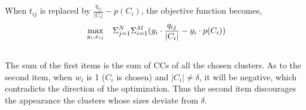 \documentclass[times]{ettauth}
\theoremstyle{mytheoremstyle}
\theoremstyle{mytheoremstyle}
\theoremstyle{mytheoremstyle}
\begin{document}

When $t_{ij}$ is replaced by $\frac{q_{ij}}{|C_i|} - p(C_i)$, the objective function becomes,
\begin{equation}
\begin{aligned}
     &\max\limits_{y_i, x_{ij}} && \Sigma_{j=1}^N\Sigma_{i=1}^M (y_i\cdot \frac{q_{ij}}{|C_i|} - y_i\cdot p(C_i)) \\
\notag
\end{aligned}
\label{centralized_opt}
\end{equation}
The sum of the first items is the sum of CCs of all the chosen clusters.
As to the second item, when $w_i$ is 1 ($C_i$ is chosen) and $|C_i|\neq\delta$, it will be negative, which contradicts the direction of the optimization.
Thus the second item discourages the appearance the clusters whose sizes deviate from $\delta$.

\end{document}
